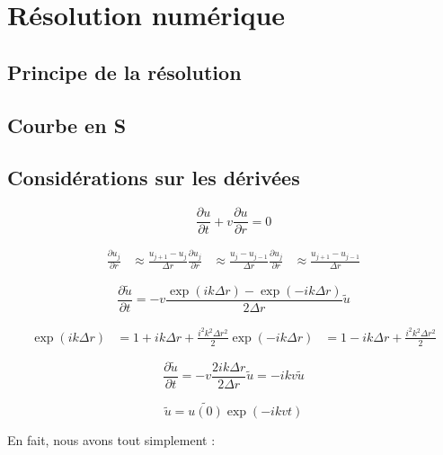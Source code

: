 \section{Résolution numérique}

\subsection{Principe de la résolution}

\subsection{Courbe en S}

\subsection{Considérations sur les dérivées}

\begin{equation}
    \frac{\partial u}{\partial t} + v \frac{\partial u}{\partial r} = 0
\end{equation}

\begin{align}
    \frac{\partial u_j}{\partial r} &\approx \frac{u_{j+1} - u_j}{\Delta{r}}
    \frac{\partial u_j}{\partial r} &\approx \frac{u_j - u_{j-1}}{\Delta{r}}
    \frac{\partial u_j}{\partial r} &\approx \frac{u_{j+1} - u_{j-1}}{\Delta{r}}
\end{align}

\begin{equation}
    \frac{\partial \tilde{u}}{\partial t} = - v \frac{\exp(ik\Delta{r}) - \exp(-ik\Delta{r})}{2 \Delta{r}} \tilde{u}
\end{equation}

\begin{align}
    \exp(ik\Delta{r}) &= 1 + ik\Delta{r} + \frac{i^2 k^2 \Delta{r}^2}{2}
    \exp(-ik\Delta{r}) &= 1 - ik\Delta{r} + \frac{i^2 k^2 \Delta{r}^2}{2}
\end{align}

\begin{equation}
    \frac{\partial \tilde{u}}{\partial t} = - v \frac{2ik\Delta{r}}{2\Delta{r}} \tilde{u} = - i k v \tilde{u}
\end{equation}

\begin{equation}
    \tilde{u} = \tilde{u(0)} \exp(-i k v t)
\end{equation}

En fait, nous avons tout simplement :

